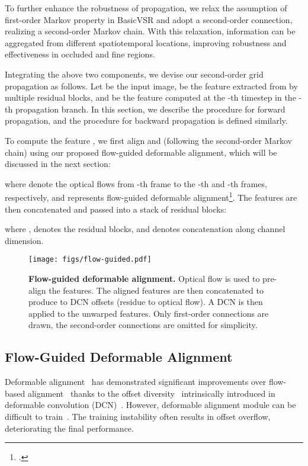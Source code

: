 \documentclass[10pt,twocolumn,letterpaper]{article}
\begin{document}
To further enhance the robustness of propagation, we relax the assumption of first-order Markov property in BasicVSR and adopt a second-order connection, realizing a second-order Markov chain. With this relaxation, information can be aggregated from different spatiotemporal locations, improving robustness and effectiveness in occluded and fine regions.

Integrating the above two components, we devise our second-order grid propagation as follows. Let  be the input image,  be the feature extracted from  by multiple residual blocks, and  be the feature computed at the -th timestep in the -th propagation branch. In this section, we describe the procedure for forward propagation, and the procedure for backward propagation is defined similarly.

To compute the feature , we first align  and  (following the second-order Markov chain) using our proposed flow-guided deformable alignment, which will be discussed in the next section:

where  denote the optical flows from -th frame to the -th and -th frames, respectively, and  represents flow-guided deformable alignment\footnote{.}. The features are then concatenated and passed into a stack of residual blocks:

where ,  denotes the residual blocks, and  denotes concatenation along channel dimension.

\begin{figure}[t]
    \begin{center}
        \texttt{[image: figs/flow-guided.pdf]}
        \caption{\textbf{Flow-guided deformable alignment.} Optical flow is used to pre-align the features. The aligned features are then concatenated to produce to DCN offsets (residue to optical flow). A DCN is then applied to the unwarped features. Only first-order connections are drawn, the second-order connections are omitted for simplicity.}
        \label{fig:flow-guided}
    \end{center}
    \vspace{-0.5cm}
\end{figure}

\subsection{Flow-Guided Deformable Alignment}
\label{sec:alignment}
Deformable alignment~\cite{wang2019deformable,wang2019edvr} has demonstrated significant improvements over flow-based alignment~\cite{haris2019recurrent,xue2019video} thanks to the offset diversity~\cite{chan2021understanding} intrinsically introduced in deformable convolution (DCN)~\cite{dai2017deformable,zhu2018deformable}.
However, deformable alignment module can be difficult to train~\cite{chan2021understanding}. The training instability often results in offset overflow, deteriorating the final performance.
\end{document}
